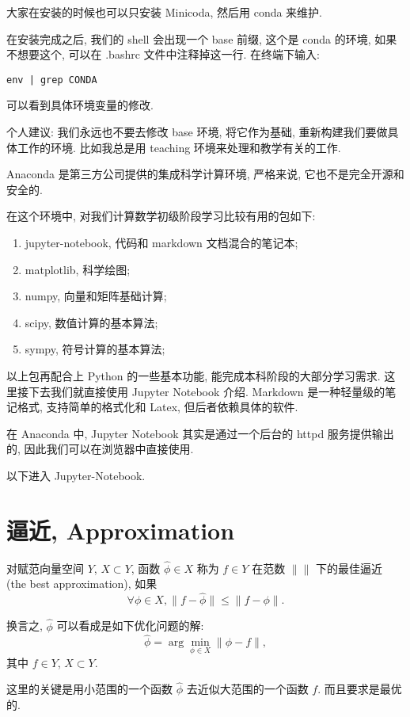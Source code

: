 \documentclass[a4paper]{ctexart}
\begin{document}
大家在安装的时候也可以只安装 Minicoda, 然后用 conda 来维护.

在安装完成之后, 我们的 shell 会出现一个 base 前缀, 这个是 conda 的环境, 如果不想要这个,
可以在 .bashrc 文件中注释掉这一行. 在终端下输入:
\begin{verbatim}
env | grep CONDA
\end{verbatim}
可以看到具体环境变量的修改.

个人建议: 我们永远也不要去修改 base 环境, 将它作为基础, 重新构建我们要做具体工作的环境.
比如我总是用 teaching 环境来处理和教学有关的工作.

Anaconda 是第三方公司提供的集成科学计算环境, 严格来说, 它也不是完全开源和安全的.

在这个环境中, 对我们计算数学初级阶段学习比较有用的包如下:

\begin{enumerate}
\item jupyter-notebook, 代码和 markdown 文档混合的笔记本;
\item matplotlib, 科学绘图;
\item numpy, 向量和矩阵基础计算;
\item scipy, 数值计算的基本算法;
\item sympy, 符号计算的基本算法;
\end{enumerate}

以上包再配合上 Python 的一些基本功能, 能完成本科阶段的大部分学习需求.
这里接下去我们就直接使用 Jupyter Notebook 介绍. Markdown 是一种轻量级的笔记格式,
支持简单的格式化和 Latex, 但后者依赖具体的软件. 

在 Anaconda 中, Jupyter Notebook 其实是通过一个后台的 httpd 服务提供输出的,
因此我们可以在浏览器中直接使用.

以下进入 Jupyter-Notebook.

\section{逼近, Approximation}
 对赋范向量空间 $Y$, $X \subset Y$, 函数 $\hat{\phi} \in X$ 称为 $f \in Y$
在范数 $\|\|$ 下的最佳逼近 (the best approximation), 如果
$$
\forall \phi \in X, \|f - \hat{\phi}\| \leq \|f - \phi\|.
$$

换言之, $\hat{\phi}$ 可以看成是如下优化问题的解:
$$
\hat{\phi} = \arg \min_{\phi \in X} \|\phi - f\|, 
$$
其中 $f \in Y$, $X \subset Y$.

这里的关键是用小范围的一个函数 $\hat{\phi}$ 去近似大范围的一个函数 $f$. 而且要求是最优的.
\end{document}
